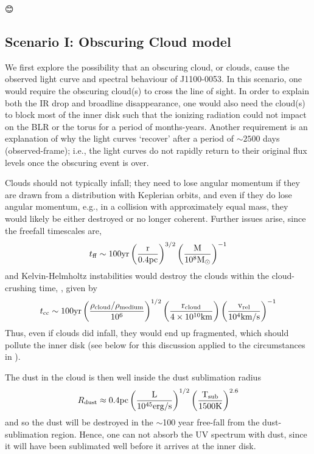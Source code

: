 \documentclass[11pt,a4paper]{article}
\begin{document}
😊


\subsection*{Scenario I: Obscuring Cloud model}
We first explore the possibility that an obscuring cloud, or clouds,
cause the observed light curve and spectral behaviour of J1100-0053.  In
this scenario, one would require the obscuring cloud(s) to cross the
line of sight. In order to explain both the IR drop and broadline
disappearance, one would also need the cloud(s) to block most of the
inner disk such that the ionizing radiation could not impact on the
BLR or the torus for a period of months-years.  Another requirement
is an explanation of why the light curves `recover' after a period of
$\sim 2500$ days (observed-frame); i.e., the light curves do not
rapidly return to their original flux levels once the obscuring event
is over.

Clouds should not typically infall; they need to lose angular momentum
if they are drawn from a distribution with Keplerian orbits, and even
if they do lose angular momentum, e.g., in a collision with
approximately equal mass, they would likely be either destroyed or no
longer coherent. Further issues 
arise, since the freefall timescales
are,
\begin{equation}
    t_{{\rm ff}}   \sim 100   \rm{yr}  \left(\frac{r}{0.4\rm{pc}}\right)^{3/2} 
                                            \left(\frac{M}{10^{8}M_{\odot}}\right)^{-1}
\end{equation}
and Kelvin-Helmholtz instabilities would destroy the clouds within the
cloud-crushing time, \citep[e.g., ][]{Nagakura2008, Hopkins2013,
Shiokawa2015, Bae2016},
given by
\begin{equation}
    t_{\rm cc} \sim 100\rm{yr} \left(\frac{\rho_{cloud}/\rho_{medium}}{10^{6}}\right)^{1/2} 
                                            \left(\frac{r_{\rm cloud}}{4 \times 10^{10}\rm{km}}\right) 
                                            \left(\frac{v_{\rm rel}}{10^{4}\rm{km/s}}\right)^{-1}
\end{equation}
Thus, even if clouds did infall, they would end up fragmented, which
should pollute the inner disk (see below for this discussion applied
to the circumstances in \citet{Guo2016}).

The dust in the cloud is then well inside the dust sublimation radius
\begin{equation}
    R_{\rm dust} \approx 0.4\rm{pc}\left(\frac{L}{10^{45}\rm{erg/s}}\right)^{1/2}
                                                   \left(\frac{T_{\rm sub}}{1500\rm{K}}\right)^{2.6}
\end{equation}
and so the dust will be destroyed in the $\sim$100 year free-fall from
the dust-sublimation region. Hence, one can not absorb the UV spectrum
with dust, since it will have been sublimated well before it arrives
at the inner disk.
\end{document}
